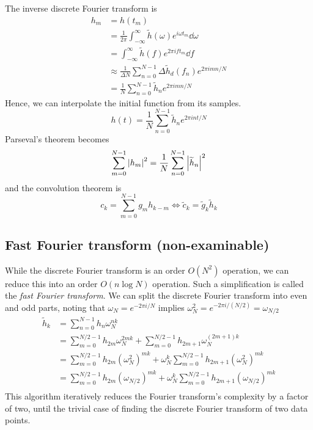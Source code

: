 The inverse discrete Fourier transform is
\begin{align*}
	h_m & = h(t_m)                                                                                  \\
	    & = \frac{1}{2\pi} \int_{-\infty}^\infty \widetilde h(\omega) e^{i \omega t_m} \dd{\omega}  \\
	    & = \int_{-\infty}^\infty \widetilde h(f) e^{2\pi i f t_m} \dd{f}                           \\
	    & \approx \frac{1}{\Delta N} \sum_{n=0}^{N-1} \Delta \widetilde h_d(f_n) e^{2\pi i m n / N} \\
	    & = \frac{1}{N} \sum_{n=0}^{N-1} \widetilde h_n e^{2\pi i m n / N}
\end{align*}
Hence, we can interpolate the initial function from its samples.
\[
	h(t) = \frac{1}{N} \sum_{n=0}^{N-1} \widetilde h_n e^{2\pi i n t / N}
\]
Parseval's theorem becomes
\[
	\sum_{m=0}^{N-1} \abs{h_m}^2 = \frac{1}{N} \sum_{n=0}^{N-1} \abs{\widetilde h_n}^2
\]
and the convolution theorem is
\[
	c_k = \sum_{m=0}^{N-1} g_m h_{k-m} \iff \widetilde c_k = \widetilde g_k \widetilde h_k
\]

\subsection{Fast Fourier transform (non-examinable)}
While the discrete Fourier transform is an order \( O(N^2) \) operation, we can reduce this into an order \( O(n \log N) \) operation.
Such a simplification is called the \textit{fast Fourier transform}.
We can split the discrete Fourier transform into even and odd parts, noting that \( \omega_N = e^{-2\pi i / N} \) implies \( \omega_N^2 = e^{-2 \pi i / (N/2)} = \omega_{N/2} \)
\begin{align*}
	\widetilde h_k & = \sum_{n=0}^{N-1} h_n \omega_N^{nk}                                                                           \\
	               & = \sum_{m=0}^{N/2-1} h_{2m} \omega_N^{2mk} + \sum_{m=0}^{N/2-1} h_{2m + 1} \omega_N^{(2m+1)k}                  \\
	               & = \sum_{m=0}^{N/2-1} h_{2m} (\omega_N^2)^{mk} + \omega_N^k \sum_{m=0}^{N/2-1} h_{2m + 1} (\omega_N^2)^{mk}     \\
	               & = \sum_{m=0}^{N/2-1} h_{2m} (\omega_{N/2})^{mk} + \omega_N^k \sum_{m=0}^{N/2-1} h_{2m + 1} (\omega_{N/2})^{mk} \\
\end{align*}
This algorithm iteratively reduces the Fourier transform's complexity by a factor of two, until the trivial case of finding the discrete Fourier transform of two data points.

